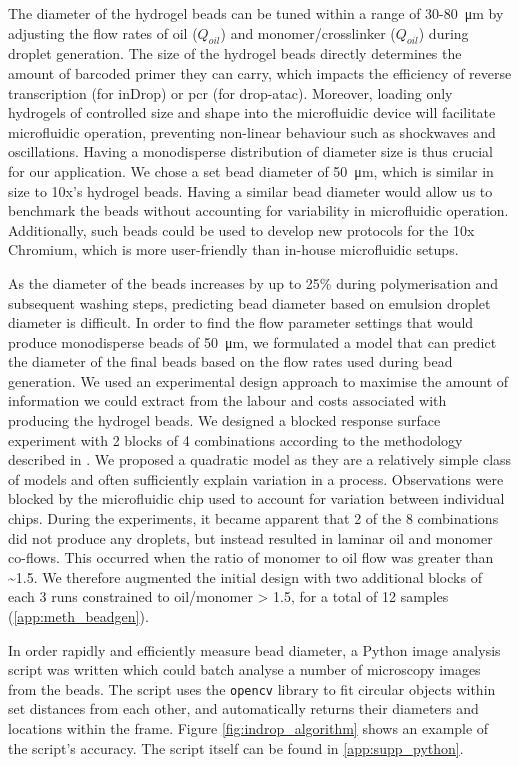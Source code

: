 The diameter of the hydrogel beads can be tuned within a range of 30-\SI{80}{\micro\metre} by adjusting the flow rates of oil ($Q_{oil}$) and monomer/crosslinker ($Q_{oil}$) during droplet generation. The size of the hydrogel beads directly determines the amount of barcoded primer they can carry, which impacts the efficiency of reverse transcription (for inDrop) or \acrshort{pcr} (for drop-\acrshort{atac}). Moreover, loading only hydrogels of controlled size and shape into the microfluidic device will facilitate microfluidic operation, preventing non-linear behaviour such as shockwaves and oscillations. Having a monodisperse distribution of diameter size is thus crucial for our application. We chose a set bead diameter of \SI{50}{\um}, which is similar in size to 10x's hydrogel beads. Having a similar bead diameter would allow us to benchmark the beads without accounting for variability in microfluidic operation. Additionally, such beads could be used to develop new protocols for the 10x Chromium, which is more user-friendly than in-house microfluidic setups.\pms

As the diameter of the beads increases by up to 25\% during polymerisation and subsequent washing steps, predicting bead diameter based on emulsion droplet diameter is difficult. In order to find the flow parameter settings that would produce monodisperse beads of \SI{50}{\micro\metre}, we formulated a model that can predict the diameter of the final beads based on the flow rates used during bead generation. We used an experimental design approach to maximise the amount of information we could extract from the labour and costs associated with producing the hydrogel beads. We designed a blocked response surface experiment with 2 blocks of 4 combinations according to the methodology described in \cite{goos2011}. We proposed a quadratic model as they are a relatively simple class of models and often sufficiently explain variation in a process. Observations were blocked by the microfluidic chip used to account for variation between individual chips. During the experiments, it became apparent that 2 of the 8 combinations did not produce any droplets, but instead resulted in laminar oil and monomer co-flows. This occurred when the ratio of monomer to oil flow was greater than \textasciitilde{}1.5. We therefore augmented the initial design with two additional blocks of each 3 runs constrained to oil/monomer > 1.5, for a total of 12 samples (\ref{app:meth_beadgen}).\pms

In order rapidly and efficiently measure bead diameter, a Python image analysis script was written which could batch analyse a number of microscopy images from the beads. The script uses the \verb|opencv| library to fit circular objects within set distances from each other, and automatically returns their diameters and locations within the frame. Figure \ref{fig:indrop_algorithm} shows an example of the script's accuracy. The script itself can be found in \ref{app:supp_python}.\pms

